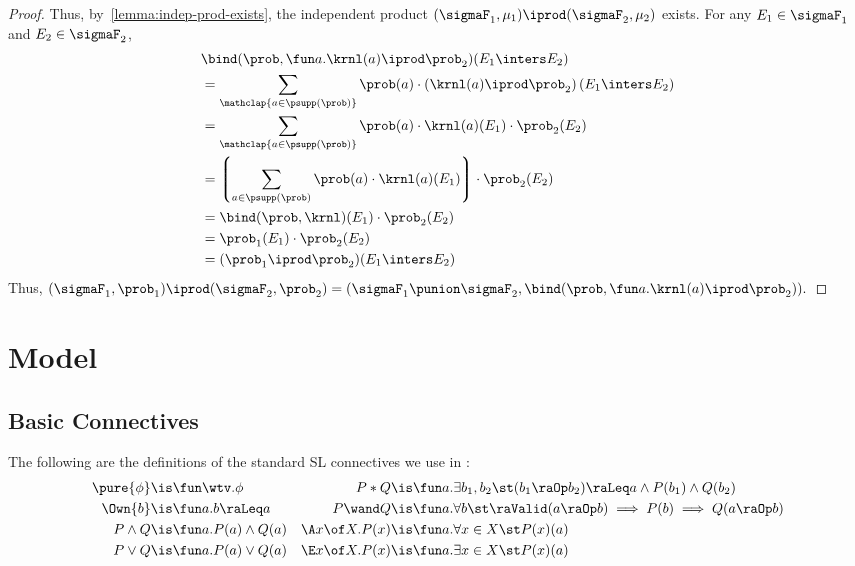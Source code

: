 \documentclass[acmsmall,nonacm,screen,appendix]{acmart}
\begin{document}
\begin{proof}
   Thus, by~\cref{lemma:indep-prod-exists},
   the independent product $(\sigmaF_1, \mu_1) \iprod (\sigmaF_2, \mu_2)$ exists.
For any $E_1 \in \sigmaF_1$ and $E_2 \in \sigmaF_2$,
\begin{align*}
   &\bind(\prob, \fun a. \krnl(a) \iprod \prob_2 ) (E_1 \inters E_2)\\
  &= \sum_{\mathclap{a \in \psupp(\prob)}}
     \prob(a) \cdot
     \left(\krnl(a) \iprod  \prob_2\right)(E_1 \inters E_2) \\
  &= \sum_{\mathclap{a \in \psupp(\prob)}}
      \prob(a) \cdot \krnl(a)(E_1) \cdot \prob_2(E_2) \\
  &= \left\lgroup
     \sum_{a \in \psupp(\prob)}
      \prob(a) \cdot \krnl(a)(E_1)
    \right\rgroup \cdot \prob_2(E_2) \\
  &= \bind(\prob, \krnl)(E_1) \cdot \prob_2(E_2) \\
  &= \prob_1(E_1) \cdot \prob_2(E_2) \\
  &= (\prob_1 \iprod \prob_2)(E_1 \inters E_2)
  \end{align*}
Thus,
  $
   (\sigmaF_1, \prob_1) \iprod (\sigmaF_2, \prob_2)
  = (\sigmaF_1 \punion \sigmaF_2,
     \bind(\prob, \fun a. \krnl(a) \iprod \prob_2)).
  $
 \end{proof}





 \section{Model}
\label{sec:appendix:model}

\subsection{Basic Connectives}

The following are the definitions of the standard SL connectives
we use in \thelogic:
\begin{align*}
  \pure{\phi} &\is \fun \wtv. \phi
  &
  P * Q &\is \fun a.
    \exists b_1,b_2 \st
      (b_1 \raOp b_2) \raLeq a \land
      P(b_1) \land
      Q(b_2)
  \\
  \Own{b} &\is \fun a. b \raLeq a
  &
  P \wand Q &\is \fun a.
    \forall b\st
     \raValid(a \raOp b)
     \implies
     P(b)
     \implies
     Q(a \raOp b)
  \\
  P \land Q &\is \fun a. P(a) \land Q(a)
  &
  \A x \of X.P(x) &\is \fun a.
    \forall x \in X\st P(x)(a)
  \\
  P \lor Q &\is \fun a. P(a) \lor Q(a)
  &
  \E x \of X.P(x) &\is \fun a.
    \exists x \in X\st P(x)(a)
\end{align*}
\end{document}
